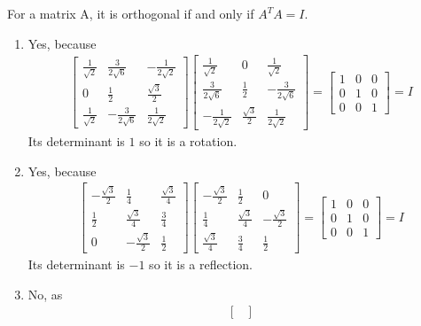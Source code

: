 \begin{Answer}
For a matrix A, it is orthogonal if and only if $A^TA = I$.
\begin{enumerate}[label=(\alph*)]
\item Yes, because
\begin{align*}
\begin{bmatrix}
\frac{1}{\sqrt{2}} & \frac{3}{2\sqrt{6}} & -\frac{1}{2\sqrt{2}}\\
0 & \frac{1}{2} & \frac{\sqrt{3}}{2}\\
\frac{1}{\sqrt{2}} & -\frac{3}{2\sqrt{6}} & \frac{1}{2\sqrt{2}}
\end{bmatrix}
\begin{bmatrix}
\frac{1}{\sqrt{2}} & 0 & \frac{1}{\sqrt{2}}\\
\frac{3}{2\sqrt{6}} & \frac{1}{2} & -\frac{3}{2\sqrt{6}}\\
-\frac{1}{2\sqrt{2}} & \frac{\sqrt{3}}{2} & \frac{1}{2\sqrt{2}}
\end{bmatrix}
=
\begin{bmatrix}
1 & 0 & 0\\
0 & 1 & 0\\
0 & 0 & 1
\end{bmatrix} = I
\end{align*}
Its determinant is $1$ so it is a rotation.
\item Yes, because
\begin{align*}
\begin{bmatrix}
-\frac{\sqrt{3}}{2} & \frac{1}{4} & \frac{\sqrt{3}}{4}\\
\frac{1}{2} & \frac{\sqrt{3}}{4} & \frac{3}{4}\\
0 & -\frac{\sqrt{3}}{2} & \frac{1}{2}
\end{bmatrix}
\begin{bmatrix}
-\frac{\sqrt{3}}{2} & \frac{1}{2} & 0\\
\frac{1}{4} & \frac{\sqrt{3}}{4} & -\frac{\sqrt{3}}{2}\\
\frac{\sqrt{3}}{4} & \frac{3}{4} & \frac{1}{2}
\end{bmatrix}
=
\begin{bmatrix}
1 & 0 & 0\\
0 & 1 & 0\\
0 & 0 & 1
\end{bmatrix} = I
\end{align*}
Its determinant is $-1$ so it is a reflection.
\item No, as
\begin{align*}
\begin{bmatrix}

\end{bmatrix}
\end{align*}
\end{enumerate}
\end{Answer}
